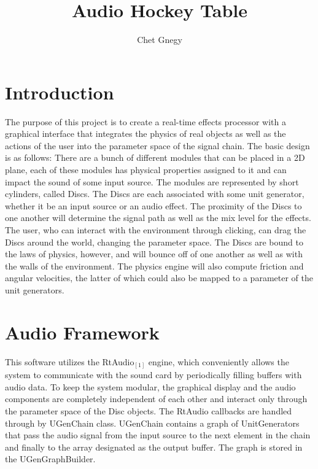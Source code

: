 \documentclass[pdftext,twoside,10pt]{article}
\title{Audio Hockey Table}
\author{Chet Gnegy}
\begin{document}
\maketitle

\section{Introduction}
The purpose of this project is to create a real-time effects processor with a graphical interface that integrates the physics of real objects as well as the actions of the user into the parameter space of the signal chain. The basic design is as follows: There are a bunch of different modules that can be placed in a 2D plane, each of these modules has physical properties assigned to it and can impact the sound of some input source. The modules are represented by short cylinders, called Discs. The Discs are each associated with some unit generator, whether it be an input source or an audio effect. The proximity of the Discs to one another will determine the signal path as well as the mix level for the effects. The user, who can interact with the environment through clicking, can drag the Discs around the world, changing the parameter space. The Discs are bound to the laws of physics, however, and will bounce off of one another as well as with the walls of the environment. The physics engine will also compute friction and angular velocities, the latter of which could also be mapped to a parameter of the unit generators.

\section{Audio Framework}

This software utilizes the RtAudio$_{[1]}$ engine, which conveniently allows the system to communicate with the sound card by periodically filling buffers with audio data. To keep the system modular, the graphical display and the audio components are completely independent of each other and interact only through the parameter space of the Disc objects. The RtAudio callbacks are handled through by UGenChain class. UGenChain contains a graph of UnitGenerators that pass the audio signal from the input source to the next element in the chain and finally to the array designated as the output buffer. The graph is stored in the UGenGraphBuilder.
\end{document}
